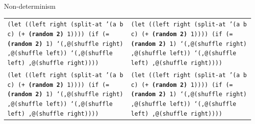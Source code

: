 \documentclass{beamer}
\begin{document}
\begin{frame}{Non-determinism}
  \tiny
  \begin{tabularx}{\textwidth}{ X X }
    \texttt{(let ((left right (split-at '(a b c)\newline
      \hphantom{\_\_\_\_\_\_\_\_\_\_\_\_\_\_\_\_\_\_\_}
      (+ \textbf{(random 2)} 1))))\newline
      \hphantom{\_\_}(if (= \textbf{(random 2)} 1)\newline
      \hphantom{\_\_\_\_\_\_}`(,@(shuffle right)\newline
      \hphantom{ \_\_\_\_\_\_\_},@(shuffle left))\newline
      \hphantom{ \_\_\_\_}`(,@(shuffle left)\newline
      \hphantom{ \_\_\_\_\_\_},@(shuffle right))))\newline
      \ 
    }
    &
    \texttt{(let ((left right (split-at '(a b c)\newline
      \hphantom{\_\_\_\_\_\_\_\_\_\_\_\_\_\_\_\_\_\_\_}
      (+ \textbf{(random 2)} 1))))\newline
      \hphantom{\_\_}(if (= \textbf{(random 2)} 1)\newline
      \hphantom{\_\_\_\_\_\_}`(,@(shuffle right)\newline
      \hphantom{ \_\_\_\_\_\_\_},@(shuffle left))\newline
      \hphantom{ \_\_\_\_}`(,@(shuffle left)\newline
      \hphantom{ \_\_\_\_\_\_},@(shuffle right))))\newline
      \ 
    }

    \\
    
    \texttt{(let ((left right (split-at '(a b c)\newline
      \hphantom{\_\_\_\_\_\_\_\_\_\_\_\_\_\_\_\_\_\_\_}
      (+ \textbf{(random 2)} 1))))\newline
      \hphantom{\_\_}(if (= \textbf{(random 2)} 1)\newline
      \hphantom{\_\_\_\_\_\_}`(,@(shuffle right)\newline
      \hphantom{ \_\_\_\_\_\_\_},@(shuffle left))\newline
      \hphantom{ \_\_\_\_}`(,@(shuffle left)\newline
      \hphantom{ \_\_\_\_\_\_},@(shuffle right))))\newline
      \ 
    }
    &
    \texttt{(let ((left right (split-at '(a b c)\newline
      \hphantom{\_\_\_\_\_\_\_\_\_\_\_\_\_\_\_\_\_\_\_}
      (+ \textbf{(random 2)} 1))))\newline
      \hphantom{\_\_}(if (= \textbf{(random 2)} 1)\newline
      \hphantom{\_\_\_\_\_\_}`(,@(shuffle right)\newline
      \hphantom{ \_\_\_\_\_\_\_},@(shuffle left))\newline
      \hphantom{ \_\_\_\_}`(,@(shuffle left)\newline
      \hphantom{ \_\_\_\_\_\_},@(shuffle right))))\newline
      \ 
    }


\end{tabularx}
\end{frame}
\end{document}

